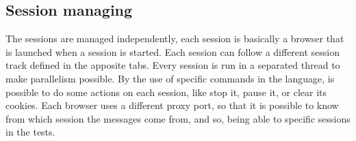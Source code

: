 %

\subsection{Session managing}
The sessions are managed independently, each session is basically a browser that is launched when a session is started. Each session can follow a different \gls{session track} defined in the apposite tabs. Every session is run in a separated thread to make parallelism possible. By the use of specific commands in the language, is possible to do some actions on each session, like stop it, pause it, or clear its cookies. Each browser uses a different proxy port, so that it is possible to know from which session the messages come from, and so, being able to specific sessions in the tests.







